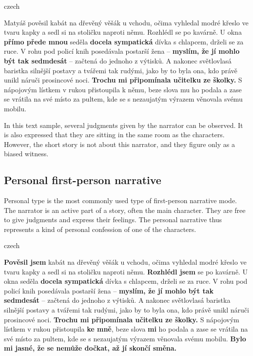 \begin{otherlanguage*}{czech}
\begin{quoting}
Matyáš pověsil kabát na dřevěný věšák u vchodu, očima vyhledal modré křeslo ve tvaru kapky a sedl si na stoličku naproti němu. Rozhlédl se po kavárně. U okna \textbf{přímo přede mnou} seděla \textbf{docela sympatická} dívka s chlapcem, drželi se za ruce. V rohu pod policí knih posedávala postarší žena -- \textbf{myslím, že jí mohlo být tak sedmdesát} -- začtená do jednoho z výtisků. A nakonec světlovlasá baristka silnější postavy a tvářemi tak rudými, jako by to byla ona, kdo právě unikl náruči prosincové noci. \textbf{Trochu mi připomínala učitelku ze školky.} S nápojovým lístkem v rukou přistoupila k němu, beze slova mu ho podala a zase se vrátila na své místo za pultem, kde se s nezaujatým výrazem věnovala svému mobilu.
\newline
\end{quoting}
\end{otherlanguage*}

In this text sample, several judgments given by the narrator can be observed. It is also expressed that they are sitting in the same room as the characters. However, the short story is not about this narrator, and they figure only as a biased witness.

\subsection{Personal first-person narrative}
Personal type is the most commonly used type of first-person narrative mode. The narrator is an active part of a story, often the main character. They are free to give judgments and express their feelings. The personal narrative thus represents a kind of personal confession of one of the characters. \cite{dolezel-narativni-zpusoby}\newline

\begin{otherlanguage*}{czech}
\begin{quoting}
\textbf{Pověsil jsem} kabát na dřevěný věšák u vchodu, očima vyhledal modré křeslo ve tvaru kapky a sedl si na stoličku naproti němu. \textbf{Rozhlédl jsem} se po kavárně. U okna seděla \textbf{docela sympatická} dívka s chlapcem, drželi se za ruce. V rohu pod policí knih posedávala postarší žena -- \textbf{myslím, že jí mohlo být tak sedmdesát} -- začtená do jednoho z výtisků. A nakonec světlovlasá baristka silnější postavy a tvářemi tak rudými, jako by to byla ona, kdo právě unikl náruči prosincové noci. \textbf{Trochu mi připomínala učitelku ze školky.} S nápojovým lístkem v rukou přistoupila \textbf{ke mně}, beze slova \textbf{mi} ho podala a zase se vrátila na své místo za pultem, kde se s nezaujatým výrazem věnovala svému mobilu. \textbf{Bylo mi jasné, že se nemůže dočkat, až jí skončí směna.} \newline
\end{quoting}
\end{otherlanguage*}

